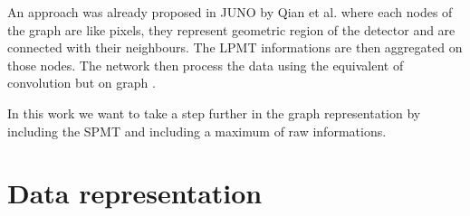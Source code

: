 \documentclass[../main.tex]{subfiles}
\begin{document}
An approach was already proposed in JUNO by Qian et al. \cite{qian_vertex_2021} where each nodes of the graph are like pixels, they represent geometric region of the detector and are connected with their neighbours. The LPMT informations are then aggregated on those nodes. The network then process the data using the equivalent of convolution but on graph \cite{defferrard_convolutional_2017}.

In this work we want to take a step further in the graph representation by including the SPMT and including a maximum of raw informations.

\section{Data representation}
\label{sec:jgnn:data}
\end{document}
